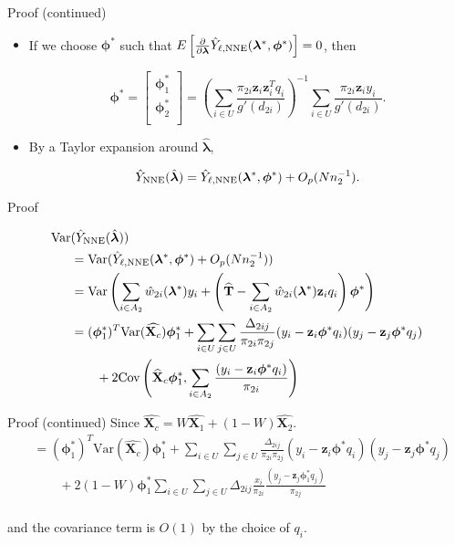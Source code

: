 \documentclass{beamer} %
\newcommand{\Cov}{{\text{Cov}}}
\newcommand{\Var}{{\text{Var}}}
\renewcommand{\bf}[1]{\mathbf{#1}}
\begin{document}
\begin{frame}{Proof (continued)}

  \begin{itemize}
    \item If we choose $\bm \phi^*$ such that $E\left[\frac{\partial}{\partial
      \bm \lambda} \hat Y_{\ell, \rm{NNE}}(\bm \lambda^*, \bm \phi^*)\right] = 0$,
        then

  $$\bm \phi^* =
  \begin{bmatrix}
    \bm \phi^*_1 \\
    \bm \phi^*_2 \\
  \end{bmatrix} =
  \left(\sum_{i \in U} \frac{\pi_{2i} \bf z_i \bf z_i^T q_i}{g'(d_{2i})} 
  \right)^{-1}
  \sum_{i \in U} \frac{\pi_{2i} \bf z_i y_i}{g'(d_{2i})}.
  $$

  \item By a Taylor expansion around $\hat{\bm \lambda}$,
  
    $$\hat Y_{\rm{NNE}}(\hat{\bm \lambda}) = \hat Y_{\ell, \rm{NNE}}(\bm \lambda^*, 
  \bm \phi^*) + O_p(Nn_2^{-1}).$$
  \end{itemize}
\end{frame}

\begin{frame}{Proof}

  \begin{align*}
    \Var&(\hat Y_{\rm{NNE}}(\hat{\bm \lambda})) \\
    &= \Var(\hat Y_{\ell, \rm{NNE}}(\bm \lambda^*, \bm \phi^*) + O_p(Nn_2^{-1})) \\ 
    &= \Var\left(\sum_{i \in A_2} \hat w_{2i}(\bm \lambda^*) y_i + 
      \left(\widehat{\bf T} - \sum_{i \in A_2} \hat w_{2i}(\bm \lambda^*) \bf z_i
    q_i\right)\bm \phi^*\right)\\
    &= (\bm \phi_1^*)^T \Var(\widehat{\bf X_c}) \bm \phi_1^* + 
    \sum_{i \in U} \sum_{j \in U} \frac{\Delta_{2ij}}{\pi_{2i}\pi_{2j}} 
    (y_i - \bf z_i \bm \phi^* q_i)(y_j - \bf z_j \bm \phi^* q_j)\\
    &\qquad+ 2 \Cov\left(\widehat{\bf X}_c \bm \phi_1^*, \sum_{i \in A_2} 
      \frac{(y_i - \bf z_i \bm \phi^* q_i)}{\pi_{2i}}\right) \\
  \end{align*}
\end{frame}

\begin{frame}{Proof (continued)}
  Since $\hat{\bf X_c} = W\hat{\bf X_1} + (1 - W) \hat{\bf X_2}$.
    \begin{align*}
    &= (\bm \phi_1^*)^T \Var(\hat{\bf X_c}) \bm \phi_1^* + 
    \sum_{i \in U} \sum_{j \in U} \frac{\Delta_{2ij}}{\pi_{2i}\pi_{2j}} 
    (y_i - \bf z_i \bm \phi^* q_i)(y_j - \bf z_j \bm \phi^* q_j)\\
    &\qquad + 2(1 - W)\bm \phi_1^* \sum_{i \in U} \sum_{j \in U} \Delta_{2ij} 
    \frac{x_i}{\pi_{2i}} \frac{(y_j - \bf z_j \bm \phi^*_1 q_j)}{\pi_{2j}}\\
  \end{align*}

  and the covariance term is $O(1)$ by the choice of $q_i$.

\end{frame}
\end{document}
